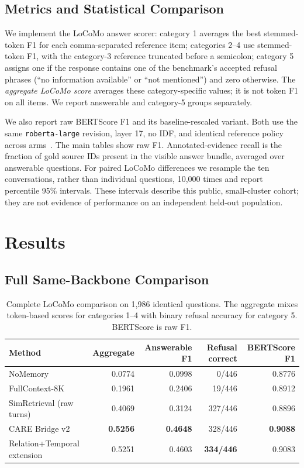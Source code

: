 \documentclass[11pt]{article}
\newcommand{\care}{\textsc{CARE}}
\begin{document}
\subsection{Metrics and Statistical Comparison}

We implement the LoCoMo answer scorer: category 1 averages the best
stemmed-token F1 for each comma-separated reference item; categories 2--4
use stemmed-token F1, with the category-3 reference truncated before a
semicolon; category 5 assigns one if the response contains one of the
benchmark's accepted refusal phrases (``no information available'' or
``not mentioned'') and zero otherwise. The \emph{aggregate LoCoMo score}
averages these category-specific values; it is not token F1 on all items.
We report answerable and category-5 groups separately.

We also report raw BERTScore F1 and its baseline-rescaled variant. Both use
the same \texttt{roberta-large} revision, layer 17, no IDF, and identical
reference policy across arms~\cite{zhang2020bertscore}. The main tables
show raw F1. Annotated-evidence recall is the fraction of gold source IDs
present in the visible answer bundle, averaged over answerable questions.
For paired LoCoMo differences we resample the ten conversations, rather
than individual questions, 10,000 times and report percentile 95\%
intervals. These intervals describe this public, small-cluster cohort; they
are not evidence of performance on an independent held-out population.

\section{Results}
\label{sec:results}

\subsection{Full Same-Backbone Comparison}

\begin{table}[t]
\centering
\caption{Complete LoCoMo comparison on 1,986 identical questions. The
aggregate mixes token-based scores for categories 1--4 with binary
refusal accuracy for category 5. BERTScore is raw F1.}
\label{tab:main}
\small
\begin{tabular}{lrrrr}
\toprule
Method & Aggregate & Answerable F1 & Refusal correct & BERTScore F1 \\
\midrule
NoMemory & 0.0774 & 0.0998 & 0/446 & 0.8776 \\
FullContext-8K & 0.1961 & 0.2406 & 19/446 & 0.8912 \\
SimRetrieval (raw turns) & 0.4069 & 0.3124 & 327/446 & 0.8896 \\
\care{} Bridge v2 & \textbf{0.5256} & \textbf{0.4648} & 328/446 & \textbf{0.9088} \\
Relation+Temporal extension & 0.5251 & 0.4603 & \textbf{334/446} & 0.9083 \\
\bottomrule
\end{tabular}
\end{table}
\end{document}
